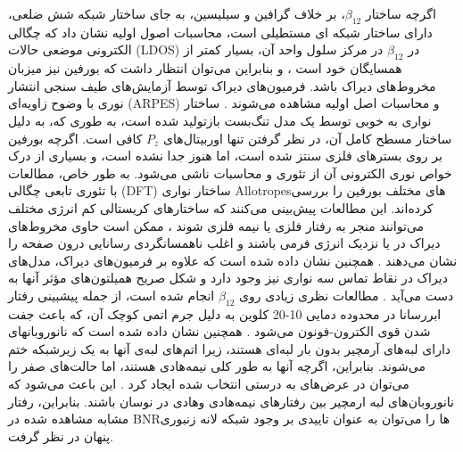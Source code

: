 اگرچه ساختار $\beta_{12}$، بر خلاف گرافین و سیلیسین، به جای ساختار شبکه شش ضلعی، دارای ساختار شبکه ای مستطیلی است، محاسبات اصول اولیه نشان داد که چگالی الکترونی موضعی حالات (\gls{LDOS}) در $\beta_{12}$ در مرکز سلول واحد آن، بسیار کمتر از  همسایگان خود است \cite{Adamska2017}، و بنابراین ‌‌می‌‌توان انتظار داشت که ‌بورفین نیز ‌میزبان مخروط‌های دیراک باشد. فر‌میون‌های دیراک توسط آزمایش‌های طیف سنجی انتشار نوری با وضوح زاویه‌ای (\gls{ARPES}) و محاسبات اصل اولیه مشاهده ‌‌می‌‌شوند \cite{fengDiracFermionsBorophene2017}. ساختار نواری به خوبی توسط یک مدل تنگ‌بست بازتولید شده است، به طوری که، به دلیل ساختار مسطح کامل آن، در نظر گرفتن تنها اوربیتال‌های $P_z$ کافی است. اگرچه ‌بورفین بر روی بسترهای فلزی سنتز شده است، اما هنوز جدا نشده است، و بسیاری از درک خواص نوری الکترونی آن از تئوری و محاسبات ناشی ‌‌می‌‌شود. به طور خاص، مطالعات با تئوری تابعی چگالی (\gls{DFT}) ساختار نواری \gls{Allotropes}های مختلف ‌بورفین را بررسی کرده‌اند. این مطالعات پیش‌بینی ‌می‌‌کنند که ساختارهای کریستالی کم انرژی مختلف ‌می‌توانند منجر به رفتار فلزی یا نیمه فلزی شوند \cite{Adamska2017,zhouSemimetallicTwoDimensionalBoron2014}، ممکن است حاوی مخروط‌های دیراک در یا نزدیک انرژی فر‌‌می‌‌ \cite{maGraphenelikeTwoDimensionalIonic2016, kouHighmobilityAnisotropicTransport2016, wangFirstPrinciplesStudyAdsorption2017, lopez-bezanillaElectronicMagneticProperties2016} باشند و اغلب ناهمسانگردی رسانایی درون صفحه را نشان ‌‌می‌‌دهند \cite{tsafackThermomechanicalAnalysisTwodimensional2016}. همچنین نشان داده شده است که علاوه بر فر‌میون‌های دیراک، مدل‌های دیراک در نقاط تماس سه نواری نیز وجود دارد و شکل صریح همیلتون‌های مؤثر آنها به دست ‌می‌آید \cite{ezawaTripletFermionsDirac2017}. مطالعات نظری زیادی روی $\beta_{12}$ انجام شده است، \cite{wang2019review,Peng2017Stability,Zhang2017Twodimensional} از جمله پیشبینی رفتار ابررسانا در محدوده دمایی 10-20 کلوین به دلیل جرم  اتمی‌‌ کوچک آن، که باعث جفت شدن قوی الکترون-فونون ‌می‌شود \cite{Penev2016Can}.
همچنین نشان داده شده است که نانوروبانهای دارای لبه‌های آرمچیر بدون بار لبه‌ای هستند، زیرا اتم‌های لبه‌ی آنها به یک زیرشبکه ختم ‌می‌شوند. 
بنابراین، اگرچه آنها به طور کلی نیمه‌هادی هستند، اما حالت‌های صفر را ‌‌می‌‌توان در عرض‌های به درستی انتخاب شده ایجاد کرد \cite{nikanEffectsEdgeDefects2022}. این باعث ‌‌می‌‌شود که نانوروبان‌های لبه ارمچیر بین رفتارهای نیمه‌هادی و‌هادی در نوسان باشند. بنابراین، رفتار مشابه مشاهده شده در \gls{BNR}ها‌ را ‌‌می‌‌توان به عنوان تاییدی بر وجود شبکه لانه زنبوری پنهان در نظر گرفت.

